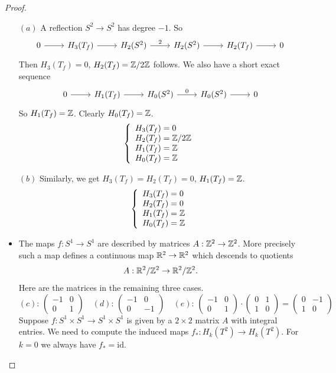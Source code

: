 \begin{proof}
\mbox{}
\begin{itemize}
\item[$(a)$]A reflection $S^2\to S^2$ has degree $-1$. So 
\[\begin{tikzcd}
0\ar[r]&H_3(T_f)\ar[r]&H_2(S^2)\ar[r,"2"]&H_2(S^2)\ar[r]&H_2(T_f)\ar[r]&0
\end{tikzcd}\]
Then $H_3(T_f)=0$, $H_2(T_f)=\mathbb{Z}/2\mathbb{Z}$ follows. We also have a short exact sequence
\[\begin{tikzcd}
0\ar[r]&H_1(T_f)\ar[r]&H_0(S^2)\ar[r,"0"]&H_0(S^2)\ar[r]&0
\end{tikzcd}\]
So $H_1(T_f)=\mathbb{Z}$. Clearly $H_0(T_f)=\mathbb{Z}$.
\[\left\{\begin{array}{l}
H_3(T_f)=0\\
H_2(T_f)=\mathbb{Z}/2\mathbb{Z}\\
H_1(T_f)=\mathbb{Z}\\
H_0(T_f)=\mathbb{Z}
\end{array}\right. \]
\item[$(b)$] Similarly, we get $H_3(T_f)=H_2(T_f)=0$, $H_1(T_f)=\mathbb{Z}$.
\[\left\{\begin{array}{l}
H_3(T_f)=0\\
H_2(T_f)=0\\
H_1(T_f)=\mathbb{Z}\\
H_0(T_f)=\mathbb{Z}
\end{array}\right. \]
\item The maps $f:S^1\to S^1$ are described by matrices $A:\mathbb{Z}^2\to \mathbb{Z}^2$. More precisely such a map defines a continuous map $\mathbb{R}^2\to\mathbb{R}^2$ which descends to quotients
\[A:\mathbb{R}^2/\mathbb{Z}^2\to\mathbb{R}^2/\mathbb{Z}^2.\]
Here are the matrices in the remaining three cases.
\[(c):\,\begin{pmatrix}
-1&0\\
0&1
\end{pmatrix}\quad(d):\,\begin{pmatrix}
-1&0\\
0&-1
\end{pmatrix}\quad(e):\,\begin{pmatrix}
-1&0\\
0&1
\end{pmatrix}\cdot\begin{pmatrix}
0&1\\
1&0
\end{pmatrix}=\begin{pmatrix}
0&-1\\
1&0
\end{pmatrix}\]
Suppose $f:S^1\times S^1\to S^1\times S^1$ is given by a $2\times2$ matrix $A$ with integral entries. We need to compute the induced maps $f_*:H_k(T^2)\to H_k(T^2)$. For $k=0$ we always have $f_*=\mathrm{id}$.\par

\end{itemize}
\end{proof}
